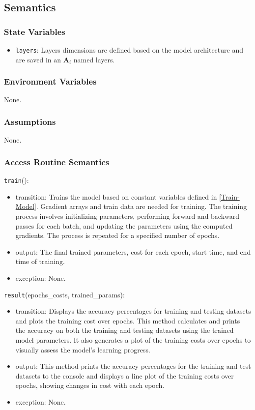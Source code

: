 \documentclass[12pt, titlepage]{article}
\def\code#1{\texttt{#1}}
\begin{document}
\subsection{Semantics}

\subsubsection{State Variables}
\begin{itemize}
  \item \code{layers}: Layers dimensions are defined based on the 
  model architecture and are saved in an $\mathbf{A}_{i}$ named layers.
\end{itemize}

\subsubsection{Environment Variables}
None.

\subsubsection{Assumptions}
None.

\subsubsection{Access Routine Semantics}

\noindent \code{train}():
\begin{itemize}
  \item transition: Trains the model based on constant variables defined in \ref{Train-Model}. 
  Gradient arrays and train data are needed for training. 
  The training process involves initializing parameters, performing forward and backward 
  passes for each batch, and updating the parameters using the computed gradients. The 
  process is repeated for a specified number of epochs.
  \item output: The final trained parameters, cost for each epoch, 
  start time, and end time of training.
  \item exception: None.
\end{itemize}

\noindent \code{result}(epochs\_costs, trained\_params):
\begin{itemize}
  \item transition: Displays the accuracy percentages for training and testing 
  datasets and plots the training cost over epochs.
  This method calculates and prints the accuracy on both the 
  training and testing datasets using the trained model parameters. 
  It also generates a plot of the training costs over epochs to 
  visually assess the model's learning progress.
  \item output: This method prints the accuracy percentages for 
  the training and test datasets to the console and
  displays a line plot of the training costs over 
  epochs, showing changes in cost with each epoch.
  \item exception: None.
\end{itemize}
\end{document}

